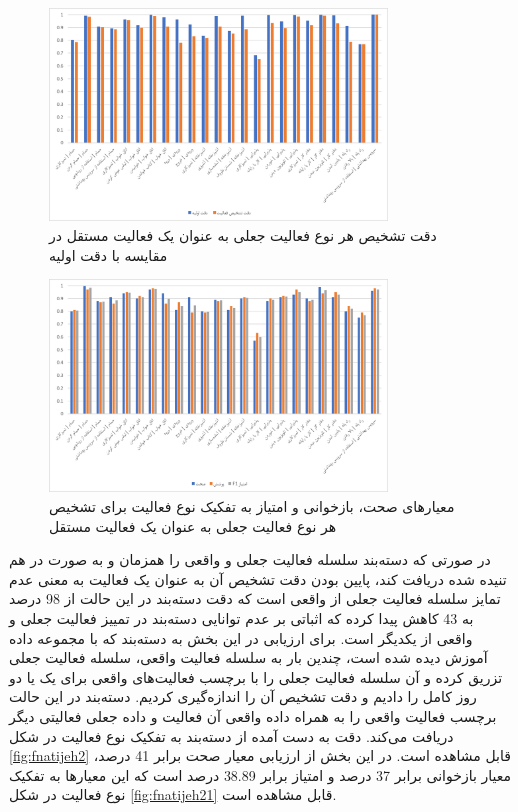\begin{figure}[H]
\centerline{\includegraphics[width=0.8\textwidth]{figs/fnatijeh1.png}}
\caption{دقت تشخیص هر نوع فعالیت جعلی به عنوان یک فعالیت مستقل در مقایسه با دقت اولیه}
\label{fig:fnatijeh1}
\end{figure}

\begin{figure}[H]
\centerline{\includegraphics[width=0.8\textwidth]{figs/fnatijeh11.png}}
\caption{معیارهای صحت، بازخوانی و امتیاز  به تفکیک نوع فعالیت برای تشخیص هر نوع فعالیت جعلی به عنوان یک فعالیت مستقل}
\label{fig:fnatijeh11}
\end{figure}

در صورتی که دسته‌بند سلسله فعالیت جعلی و واقعی را همزمان و به صورت در هم تنیده شده دریافت کند، پایین بودن دقت تشخیص آن به عنوان یک فعالیت به معنی عدم تمایز سلسله فعالیت جعلی از واقعی است که دقت دسته‌بند در این حالت از 98 درصد به 43 کاهش پیدا کرده که اثباتی بر عدم توانایی دسته‌بند در تمییز فعالیت جعلی و واقعی از یکدیگر است. برای ارزیابی در این بخش به دسته‌بند که با مجموعه داده  آموزش دیده شده است، چندین بار به سلسله فعالیت واقعی، سلسله فعالیت جعلی تزریق کرده و آن سلسله فعالیت جعلی را با برچسب فعالیت‌های واقعی برای یک یا دو روز کامل را دادیم و دقت تشخیص آن را اندازه‌گیری کردیم. دسته‌بند در این حالت برچسب فعالیت واقعی را به همراه داده واقعی آن فعالیت و داده جعلی فعالیتی دیگر دریافت می‌کند. دقت به دست آمده از دسته‌بند به تفکیک نوع فعالیت در شکل \ref{fig:fnatijeh2} قابل مشاهده است. در این بخش از ارزیابی معیار صحت برابر 41 درصد، معیار بازخوانی برابر 37 درصد و امتیاز  برابر 38.89 درصد است که این معیارها به تفکیک نوع فعالیت در شکل \ref{fig:fnatijeh21} قابل مشاهده است.

